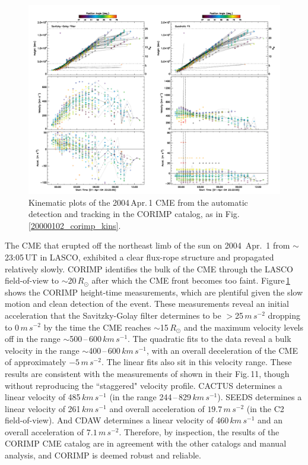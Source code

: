 \documentclass[referee,a4paper,12pt,traditabstract]{swsc}
\begin{document}
\begin{linenumbers}
\begin{figure}[t]
\centerline{\includegraphics[width=\linewidth]{images/20040401_corimp_kins.pdf}}
\caption{Kinematic plots of the 2004\,Apr.\,1 CME from the automatic detection and tracking in the CORIMP catalog, as in Fig.\,\ref{20000102_corimp_kins}.}
\label{20040401_corimp_kins}
\end{figure}

The CME that erupted off the northeast limb of the sun on 2004~Apr.~1 from $\sim$23:05\,UT in LASCO, exhibited a clear flux-rope structure and propagated relatively slowly. CORIMP identifies the bulk of the CME through the LASCO field-of-view to $\sim$20\,$R_\odot$ after which the CME front becomes too faint. Figure\,\ref{20040401_corimp_kins} shows the CORIMP height-time measurements, which are plentiful given the slow motion and clean detection of the event. These measurements reveal an initial acceleration that the Savitzky-Golay filter determines to be $>$25\,$m\,s^{-2}$ dropping to 0\,$m\,s^{-2}$ by the time the CME reaches $\sim$15\,$R_\odot$ and the maximum velocity levels off in the range $\sim$500\,--\,600\,$km\,s^{-1}$. The quadratic fits to the data reveal a bulk velocity in the range $\sim$400\,--\,600\,$km\,s^{-1}$, with an overall deceleration of the CME of approximately $-5\,m\,s^{-2}$. The linear fits also sit in this velocity range. These results are consistent with the measurements of \cite{2009A&A...495..325B} shown in their Fig.\,11, though without reproducing the ``staggered" velocity profile. CACTUS determines a linear velocity of 485$\,km\,s^{-1}$ (in the range 244\,--\,829\,$km\,s^{-1}$). SEEDS determines a linear velocity of 261\,$km\,s^{-1}$ and overall acceleration of $19.7\,m\,s^{-2}$ (in the C2 field-of-view). And CDAW determines a linear velocity of 460$\,km\,s^{-1}$ and an overall acceleration of $7.1\,m\,s^{-2}$. Therefore, by inspection, the results of the CORIMP CME catalog are in agreement with the other catalogs and manual analysis, and CORIMP is deemed robust and reliable.




\end{linenumbers}
\end{document}

